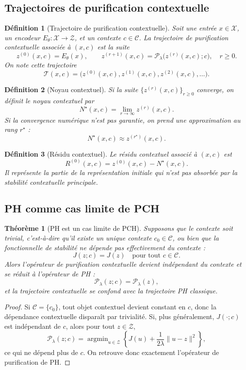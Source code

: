 \documentclass[11pt,a4paper]{article}
\newtheorem{definition}{Définition}[section]
\newtheorem{theorem}{Théorème}[section]
\DeclareMathOperator{\argmin}{argmin}
\newcommand{\X}{\mathcal X}
\newcommand{\C}{\mathcal C}
\newcommand{\Z}{\mathcal Z}
\newcommand{\T}{\mathcal T}
\newcommand{\Pcal}{\mathcal P}
\newcommand{\1}{\mathbf 1}
\begin{document}
\subsection{Trajectoires de purification contextuelle}

\begin{definition}[Trajectoire de purification contextuelle]
Soit une entrée \(x\in\X\), un encodeur \(E_\theta:\X\to\Z\), et un contexte \(c\in\C\).
La trajectoire de purification contextuelle associée à \((x,c)\) est la suite
\[
z^{(0)}(x,c)=E_\theta(x),
\qquad
z^{(r+1)}(x,c)=\Pcal_{\lambda}\!\bigl(z^{(r)}(x,c);c\bigr),
\quad r\ge 0.
\]
On note cette trajectoire
\[
\T(x,c)=\bigl(z^{(0)}(x,c),z^{(1)}(x,c),z^{(2)}(x,c),\dots\bigr).
\]
\end{definition}

\begin{definition}[Noyau contextuel]
Si la suite \(\{z^{(r)}(x,c)\}_{r\ge 0}\) converge, on définit le noyau contextuel par
\[
N^\star(x,c)=\lim_{r\to\infty}z^{(r)}(x,c).
\]
Si la convergence numérique n'est pas garantie, on prend une approximation au rang \(r^\star\) :
\[
N^\star(x,c)\approx z^{(r^\star)}(x,c).
\]
\end{definition}

\begin{definition}[Résidu contextuel]
Le résidu contextuel associé à \((x,c)\) est
\[
R^{(0)}(x,c)=z^{(0)}(x,c)-N^\star(x,c).
\]
Il représente la partie de la représentation initiale qui n'est pas absorbée par la stabilité contextuelle principale.
\end{definition}

\subsection{PH comme cas limite de PCH}

\begin{theorem}[PH est un cas limite de PCH]
Supposons que le contexte soit trivial, c'est-à-dire qu'il existe un unique contexte \(c_0\in\C\), ou bien que la fonctionnelle de stabilité ne dépende pas effectivement du contexte :
\[
J(z;c)=J(z)
\quad\text{pour tout } c\in\C.
\]
Alors l'opérateur de purification contextuelle devient indépendant du contexte et se réduit à l'opérateur de PH :
\[
\Pcal_{\lambda}(z;c)=\Pcal_{\lambda}(z),
\]
et la trajectoire contextuelle se confond avec la trajectoire PH classique.
\end{theorem}

\begin{proof}
Si \(\C=\{c_0\}\), tout objet contextuel devient constant en \(c\), donc la dépendance contextuelle disparaît par trivialité.
Si, plus généralement, \(J(\cdot;c)\) est indépendant de \(c\), alors pour tout \(z\in\Z\),
\[
\Pcal_{\lambda}(z;c)
=
\argmin_{u\in\Z}
\left\{
J(u)+\frac{1}{2\lambda}\|u-z\|^2
\right\},
\]
ce qui ne dépend plus de \(c\).
On retrouve donc exactement l'opérateur de purification de PH.
\end{proof}
\end{document}
